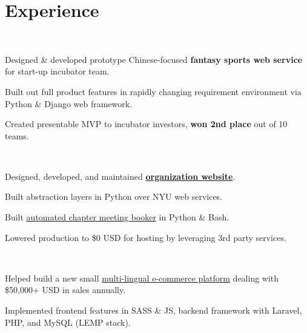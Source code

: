 \documentclass[]{hieudo-build}
\begin{document}
\begin{minipage}[t]{0.65\textwidth} 

\section{Experience}

\\
\vspace{0.9em} %
\begin{tightemize}
\item Designed \& developed prototype Chinese-focused {\bf fantasy sports web service} for start-up incubator team.
\item Built out full product features in rapidly changing requirement environment via Python \& Django web framework.
\item Created presentable MVP to incubator investors, {\bf won 2nd place} out of 10 teams.
\end{tightemize}
\sectionsep

\\
\begin{tightemize}
\item Designed, developed, and maintained  {\bf \href{https://www.skullhouse.nyc}{organization website}}.
\item Built abstraction layers in Python over NYU web services.
\item Built \href{https://github.com/JasonYao/Bobst-Room-Automator}{automated chapter meeting booker} in Python \& Bash.
\item Lowered production to \$0 USD for hosting by leveraging 3rd party services.
\end{tightemize}
\sectionsep

 \\
\begin{tightemize}
\item Helped build a new small \href{http://hivi.us/}{multi-lingual e-commerce platform} dealing with \$50,000+ USD in sales annually.
\item Implemented frontend features in SASS \& JS, backend framework with Laravel, PHP, and MySQL (LEMP stack).
\end{tightemize}
\sectionsep


\end{minipage}
\end{document}

